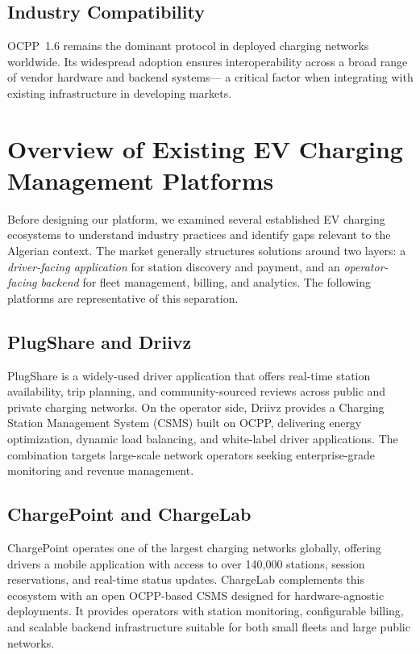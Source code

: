 \documentclass[12pt,a4paper]{report}
\begin{document}
\subsection{Industry Compatibility}

OCPP~1.6 remains the dominant protocol in deployed charging networks worldwide. Its widespread
adoption ensures interoperability across a broad range of vendor hardware and backend systems---
a critical factor when integrating with existing infrastructure in developing markets.

\section{Overview of Existing EV Charging Management Platforms}

Before designing our platform, we examined several established EV charging ecosystems
to understand industry practices and identify gaps relevant to the Algerian context.
The market generally structures solutions around two layers: a \textit{driver-facing
application} for station discovery and payment, and an \textit{operator-facing backend}
for fleet management, billing, and analytics. The following platforms are representative
of this separation.

\subsection{PlugShare and Driivz}

PlugShare is a widely-used driver application that offers real-time station availability,
trip planning, and community-sourced reviews across public and private charging networks.
On the operator side, Driivz provides a Charging Station Management System (CSMS) built
on OCPP, delivering energy optimization, dynamic load balancing, and white-label driver
applications. The combination targets large-scale network operators seeking enterprise-grade
monitoring and revenue management.

\subsection{ChargePoint and ChargeLab}

ChargePoint operates one of the largest charging networks globally, offering drivers a
mobile application with access to over 140{,}000 stations, session reservations, and
real-time status updates. ChargeLab complements this ecosystem with an open OCPP-based
CSMS designed for hardware-agnostic deployments. It provides operators with station
monitoring, configurable billing, and scalable backend infrastructure suitable for both
small fleets and large public networks.
\end{document}
